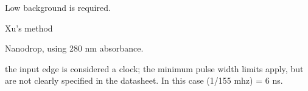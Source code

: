 



Low background is required.

Xu's method \cite{Quantification2020}



Nanodrop, using 280 nm absorbance.


the input edge is considered a clock; the minimum pulse width limits apply, but are not clearly specified in the datasheet. In this case (1/155 mhz) = 6 ns.

